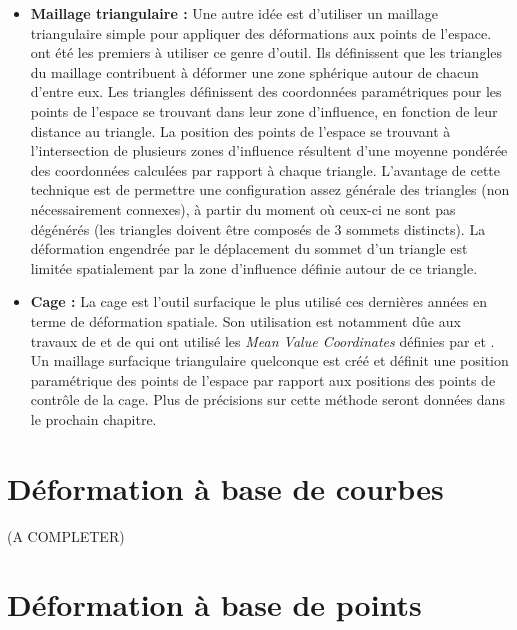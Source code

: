 \begin{itemize}
\item{\textbf{Maillage triangulaire :}} Une autre idée est d'utiliser un
maillage triangulaire simple pour appliquer des déformations aux points de
l'espace. \cite{KO03} ont été les premiers à utiliser ce genre d'outil. Ils
définissent que les triangles du maillage contribuent à déformer une zone
sphérique autour de chacun d'entre eux. Les triangles définissent des
coordonnées paramétriques pour les points de l'espace se trouvant dans leur
zone d'influence, en fonction de leur distance au triangle. La position des
points de l'espace se trouvant à l'intersection de plusieurs zones d'influence
résultent d'une moyenne pondérée des coordonnées calculées par rapport à
chaque triangle. L'avantage de cette technique est de permettre une
configuration assez générale des triangles (non nécessairement connexes), à
partir du moment où ceux-ci ne sont pas dégénérés (les triangles doivent être
composés de 3 sommets distincts). La déformation engendrée par le déplacement
du sommet d'un triangle est limitée spatialement par la zone d'influence
définie autour de ce triangle.

\item{\textbf{Cage :}} La cage est l'outil surfacique le plus utilisé ces
dernières années en terme de déformation spatiale. Son utilisation est
notamment dûe aux travaux de \cite{JSW05} et de \cite{FKR05} qui ont utilisé
les \textit{Mean Value Coordinates} définies par \cite{Flo03} et \cite{FKR05}.
Un maillage surfacique triangulaire quelconque est créé et définit une
position paramétrique des points de l'espace par rapport aux positions des
points de contrôle de la cage. Plus de précisions sur cette méthode seront
données dans le prochain chapitre.

\end{itemize}

\section{Déformation à base de courbes} 

(A COMPLETER)

\section{Déformation à base de points}

